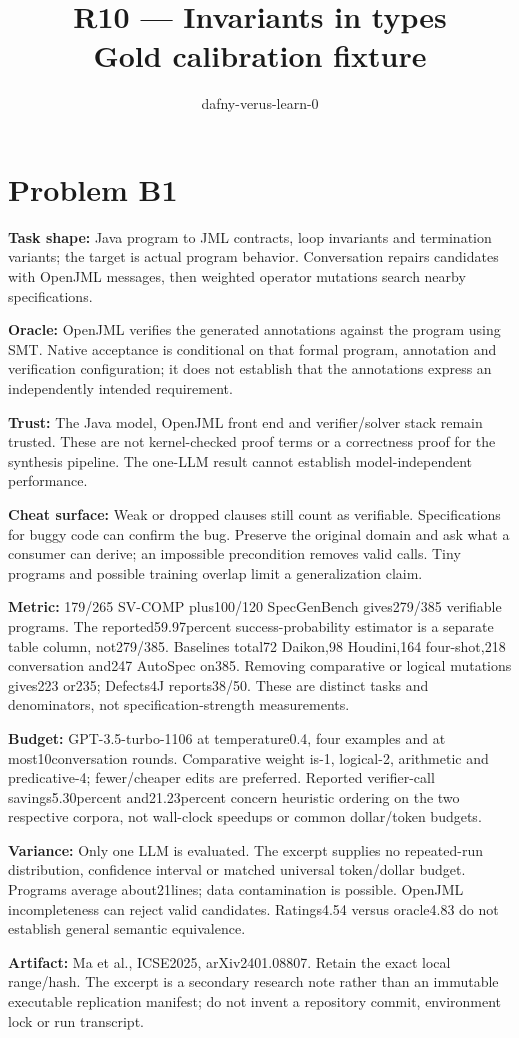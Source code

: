\documentclass[11pt]{article}
\title{R10 --- Invariants in types \\ \large Gold calibration fixture}
\author{dafny-verus-learn-0}
\date{}
\begin{document}
\maketitle
\section*{Problem B1}\label{ans:B1}
\begin{answer}
\textbf{Task shape:} Java program to JML contracts, loop invariants and termination variants; the target is actual program behavior. Conversation repairs candidates with OpenJML messages, then weighted operator mutations search nearby specifications.

\textbf{Oracle:} OpenJML verifies the generated annotations against the program using SMT. Native acceptance is conditional on that formal program, annotation and verification configuration; it does not establish that the annotations express an independently intended requirement.

\textbf{Trust:} The Java model, OpenJML front end and verifier/solver stack remain trusted. These are not kernel-checked proof terms or a correctness proof for the synthesis pipeline. The one-LLM result cannot establish model-independent performance.

\textbf{Cheat surface:} Weak or dropped clauses still count as verifiable. Specifications for buggy code can confirm the bug. Preserve the original domain and ask what a consumer can derive; an impossible precondition removes valid calls. Tiny programs and possible training overlap limit a generalization claim.

\textbf{Metric:} 179/265 SV-COMP plus100/120 SpecGenBench gives279/385 verifiable programs. The reported59.97percent success-probability estimator is a separate table column, not279/385. Baselines total72 Daikon,98 Houdini,164 four-shot,218 conversation and247 AutoSpec on385. Removing comparative or logical mutations gives223 or235; Defects4J reports38/50. These are distinct tasks and denominators, not specification-strength measurements.

\textbf{Budget:} GPT-3.5-turbo-1106 at temperature0.4, four examples and at most10conversation rounds. Comparative weight is-1, logical-2, arithmetic and predicative-4; fewer/cheaper edits are preferred. Reported verifier-call savings5.30percent and21.23percent concern heuristic ordering on the two respective corpora, not wall-clock speedups or common dollar/token budgets.

\textbf{Variance:} Only one LLM is evaluated. The excerpt supplies no repeated-run distribution, confidence interval or matched universal token/dollar budget. Programs average about21lines; data contamination is possible. OpenJML incompleteness can reject valid candidates. Ratings4.54 versus oracle4.83 do not establish general semantic equivalence.

\textbf{Artifact:} Ma et al., ICSE2025, arXiv2401.08807. Retain the exact local range/hash. The excerpt is a secondary research note rather than an immutable executable replication manifest; do not invent a repository commit, environment lock or run transcript.
\end{answer}
\end{document}
